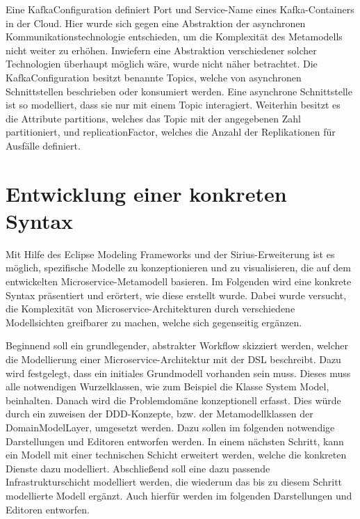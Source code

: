 Eine \glqq KafkaConfiguration\grqq{} definiert Port und Service-Name eines Kafka-Containers in der Cloud. Hier wurde sich gegen eine Abstraktion der asynchronen Kommunikationstechnologie entschieden, um die Komplexität des Metamodells nicht weiter zu erhöhen. Inwiefern eine Abstraktion verschiedener solcher Technologien überhaupt möglich wäre, wurde nicht näher betrachtet. Die KafkaConfiguration besitzt benannte Topics, welche von asynchronen Schnittstellen beschrieben oder konsumiert werden. Eine asynchrone Schnittstelle ist so modelliert, dass sie nur mit einem Topic interagiert. Weiterhin besitzt es die Attribute \glqq partitions\grqq{}, welches das Topic mit der angegebenen Zahl partitioniert, und \glqq replicationFactor\grqq{}, welches die Anzahl der Replikationen für Ausfälle definiert.


\newpage
\chapter{Entwicklung einer konkreten Syntax}

Mit Hilfe des Eclipse Modeling Frameworks und der Sirius-Erweiterung ist es möglich, spezifische Modelle zu konzeptionieren und zu visualisieren, die auf dem entwickelten Microservice-Metamodell basieren. Im Folgenden wird eine konkrete Syntax präsentiert und erörtert, wie diese erstellt wurde. Dabei wurde versucht, die Komplexität von Microservice-Architekturen durch verschiedene Modellsichten greifbarer zu machen, welche sich gegenseitig ergänzen.

Beginnend soll ein grundlegender, abstrakter Workflow skizziert werden, welcher die Modellierung einer Microservice-Architektur mit der DSL beschreibt. Dazu wird festgelegt, dass ein initiales Grundmodell vorhanden sein muss. Dieses muss alle notwendigen Wurzelklassen, wie zum Beispiel die Klasse \glqq System Model\grqq{}, beinhalten. Danach wird die Problemdomäne konzeptionell erfasst. Dies würde durch ein zuweisen der DDD-Konzepte, bzw. der Metamodellklassen der DomainModelLayer, umgesetzt werden. Dazu sollen im folgenden notwendige Darstellungen und Editoren entworfen werden. In einem nächsten Schritt, kann ein Modell mit einer technischen Schicht erweitert werden, welche die konkreten Dienste dazu modelliert. Abschließend soll eine dazu passende Infrastrukturschicht modelliert werden, die wiederum das bis zu diesem Schritt modellierte Modell ergänzt. Auch hierfür werden im folgenden Darstellungen und Editoren entworfen.

